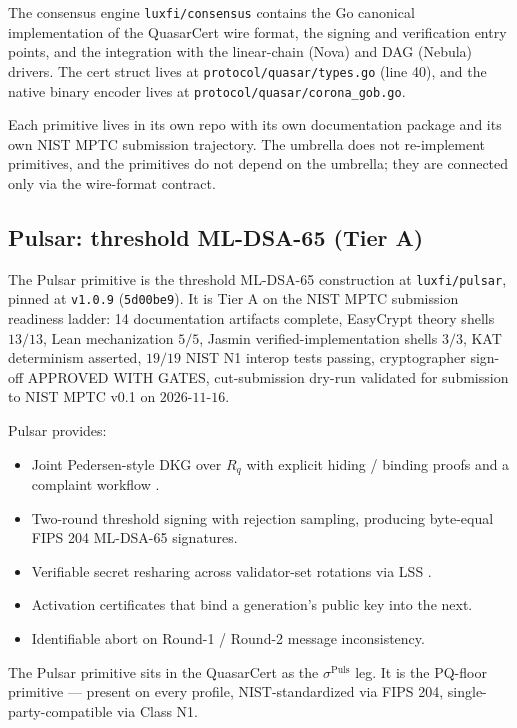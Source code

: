 The consensus engine \texttt{luxfi/consensus} \cite{consensusrepo}
contains the Go canonical implementation of the QuasarCert wire
format, the signing and verification entry points, and the
integration with the linear-chain (Nova) and DAG (Nebula) drivers.
The cert struct lives at
\texttt{protocol/quasar/types.go} (line 40), and the native binary
encoder lives at \texttt{protocol/quasar/corona\_gob.go}.

Each primitive lives in its own repo with its own documentation
package and its own NIST MPTC \cite{nistir8214c} submission
trajectory. The umbrella does not re-implement primitives, and the
primitives do not depend on the umbrella; they are connected only
via the wire-format contract.

\subsection{Pulsar: threshold ML-DSA-65 (Tier A)}

The Pulsar primitive \cite{pulsar} is the threshold ML-DSA-65
construction at \texttt{luxfi/pulsar}, pinned at \texttt{v1.0.9}
(\texttt{5d00be9}). It is Tier A on the NIST MPTC submission readiness
ladder: 14 documentation artifacts complete, EasyCrypt theory shells
$13/13$, Lean mechanization $5/5$, Jasmin verified-implementation
shells $3/3$, KAT determinism asserted, $19/19$ NIST N1 interop tests
passing, cryptographer sign-off APPROVED WITH GATES, cut-submission
dry-run validated for submission to NIST MPTC v0.1 on $2026$-$11$-$16$.

Pulsar provides:
\begin{itemize}[leftmargin=2em,nosep]
\item Joint Pedersen-style DKG over $R_q$ with explicit
      hiding / binding proofs and a complaint workflow
      \cite{pulsar,gennaro1999,pedersen91}.
\item Two-round threshold signing with rejection sampling, producing
      byte-equal FIPS 204 ML-DSA-65 signatures.
\item Verifiable secret resharing across validator-set rotations
      via LSS \cite{luxlssmpc}.
\item Activation certificates that bind a generation's public key
      into the next.
\item Identifiable abort on Round-1 / Round-2 message inconsistency.
\end{itemize}

The Pulsar primitive sits in the QuasarCert as the $\sigma^{\mathrm{Puls}}$
leg. It is the PQ-floor primitive --- present on every profile,
NIST-standardized via FIPS 204, single-party-compatible via Class N1.

